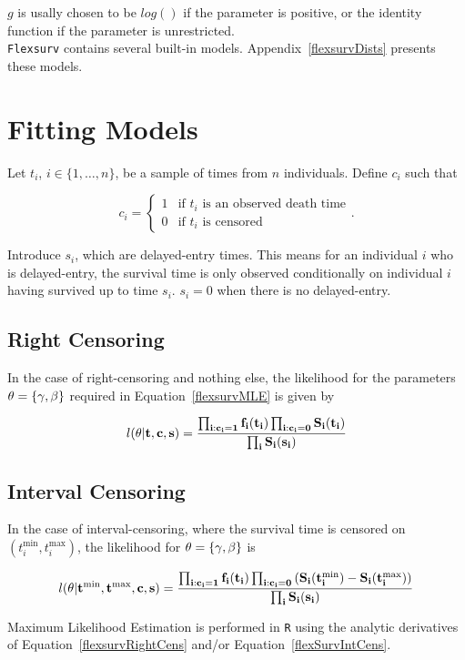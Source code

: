 $g$ is usally chosen to be $log()$ if the parameter is positive, or the identity function if the parameter is unrestricted.\\

\verb|Flexsurv| contains several built-in models. Appendix~\ref{flexsurvDists} presents these models.

\section{Fitting Models}
Let $t_i$, $i \in \{1, \ldots, n\}$, be a sample of times from $n$ individuals. Define $c_i$ such that 

\[
    c_i = \begin{cases*}
        1 & \text{if $t_i$ is an observed death time} \\
        0 & \text{if $t_i$ is censored} 
    \end{cases*}  
.\]

Introduce $s_i$, which are delayed-entry times. This means for an individual $i$ who is delayed-entry, the survival time is only observed conditionally on individual $i$ having survived up to time $s_i$. $s_i = 0$ when there is no delayed-entry. \\

\subsection{Right Censoring}
In the case of right-censoring and nothing else, the likelihood for the parameters $\bf{\theta} = \{\bf{\gamma}, \bf{\beta}\}$ required in Equation~\ref{flexsurvMLE} is given by 

\begin{equation}
    \label{flexsurvRightCens}
    l(\bf{\theta}|\bf{t},\bf{c},\bf{s}) = \frac{\prod_{i:c_i=1} f_i(t_i) \prod_{i:c_i=0} S_i(t_i)}{\prod_{i} S_i(s_i)}
\end{equation}

\subsection{Interval Censoring}
In the case of interval-censoring, where the survival time is censored on $(t_i^{\text{min}}, t_i^{\text{max}})$, the likelihood for $\bf{\theta} = \{\bf{\gamma}, \bf{\beta}\}$ is 

\begin{equation}
    \label{flexSurvIntCens}
    l(\bf{\theta}|\bf{t^\text{min}}, \bf{t^\text{max}}, \bf{c},\bf{s}) = \frac{\prod_{i:c_i=1} f_i(t_i) \prod_{i:c_i=0} \left(S_i(t_i^{\text{min}}) - S_i(t_i^{\text{max}}) \right)}{\prod_{i} S_i(s_i)}
\end{equation}

Maximum Likelihood Estimation is performed in \verb|R| using the analytic derivatives of Equation~\ref{flexsurvRightCens} and/or Equation~\ref{flexSurvIntCens}. 


